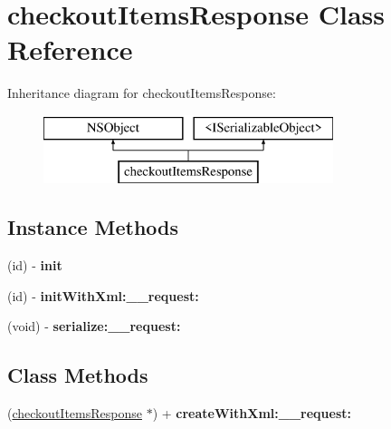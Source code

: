 \hypertarget{interfacecheckout_items_response}{}\section{checkout\+Items\+Response Class Reference}
\label{interfacecheckout_items_response}
Inheritance diagram for checkout\+Items\+Response\+:\begin{figure}[H]
\begin{center}
\leavevmode
\includegraphics[height=2.000000cm]{interfacecheckout_items_response}
\end{center}
\end{figure}
\subsection*{Instance Methods}
\begin{DoxyCompactItemize}
\item 
\hypertarget{interfacecheckout_items_response_a98394638781bf3f6d2e333cde5ea4172}{}(id) -\/ {\bfseries init}\label{interfacecheckout_items_response_a98394638781bf3f6d2e333cde5ea4172}

\item 
\hypertarget{interfacecheckout_items_response_ab1d59e6ccf8be7b44c69acfde4bc1817}{}(id) -\/ {\bfseries init\+With\+Xml\+:\+\_\+\+\_\+request\+:}\label{interfacecheckout_items_response_ab1d59e6ccf8be7b44c69acfde4bc1817}

\item 
\hypertarget{interfacecheckout_items_response_a5c94d20ec5ffc2cc4ac1198f828df89e}{}(void) -\/ {\bfseries serialize\+:\+\_\+\+\_\+request\+:}\label{interfacecheckout_items_response_a5c94d20ec5ffc2cc4ac1198f828df89e}

\end{DoxyCompactItemize}
\subsection*{Class Methods}
\begin{DoxyCompactItemize}
\item 
\hypertarget{interfacecheckout_items_response_a3810ce25047ac561a9a51fcb866f4462}{}(\hyperlink{interfacecheckout_items_response}{checkout\+Items\+Response} $\ast$) + {\bfseries create\+With\+Xml\+:\+\_\+\+\_\+request\+:}\label{interfacecheckout_items_response_a3810ce25047ac561a9a51fcb866f4462}

\end{DoxyCompactItemize}
